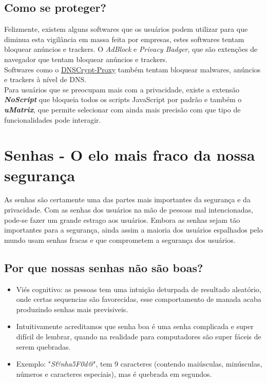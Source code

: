 \documentclass[12pt, letterpaper]{report}
\begin{document}
\subsection{Como se proteger?}
	Felizmente, existem alguns softwares que os usuários podem utilizar para que diminua esta vigilância em massa feita por empresas, estes softwares tentam bloquear anúncios e trackers. O \textit{AdBlock} e \textit{Privacy Badger}, que são extenções de navegador que tentam bloquear anúncios e trackers.\\

	Softwares como o \href{https://linuxroot1.github.io/DNSCRYPT-Proxy/}{DNSCrypt-Proxy} também tentam bloquear malwares, anúncios e trackers à nível de DNS.\\

	Para usuários que se preocupam mais com a privacidade, existe a extensão \textbf{\textit{NoScript}} que bloqueia todos os scripts JavaScript por padrão e também o \textbf{\textit{uMatrix}}, que permite selecionar com ainda mais precisão com que tipo de funcionalidades pode interagir.



\section*{Senhas - O elo mais fraco da nossa segurança}

As senhas são certamente uma das partes mais importantes da segurança e da privacidade. Com as senhas dos usuários na mão de pessoas mal intencionadas, pode-se fazer um grande estrago aos usuários. Embora as senhas sejam tão importantes para a segurança, ainda assim a maioria dos usuários espalhados pelo mundo usam senhas fracas e que comprometem a segurança dos usuários.\\

\subsection{Por que nossas senhas não são boas?}

\begin{itemize}
	\item Viés cognitivo: as pessoas tem uma intuição deturpada de resultado aleatório, onde certas sequencias são favorecidas, esse comportamento de manada acaba produzindo senhas mais previsiveis.
	\item Intuitivamente acreditamos que senha boa é uma senha complicada e super difícil de lembrar, quando na realidade para computadores são super fáceis de serem quebradas.
	\item Exemplo: "\textit{S\&nha5F0d@}", tem 9 caracteres (contendo maiúsculas, minúsculas, números e caracteres especiais), mas é quebrada em segundos.
\end{itemize}
\end{document}
